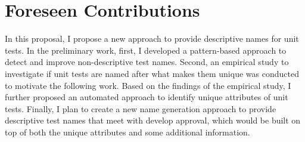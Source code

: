 \section{Foreseen Contributions}
\label{sec:contributions}

In this proposal, I propose a new approach to provide descriptive names for unit tests.
%
In the preliminary work, first, I developed a pattern-based approach to detect and improve non-descriptive test names.
%
Second, an empirical study to investigate if unit tests are named after what makes them unique was conducted to motivate the following work.
%
Based on the findings of the empirical study, I further proposed an automated approach to identify unique attributes of unit tests.
%
Finally, I plan to create a new name generation approach to provide descriptive test names that meet with develop approval, which would be built on top of both the unique attributes and some additional information.


